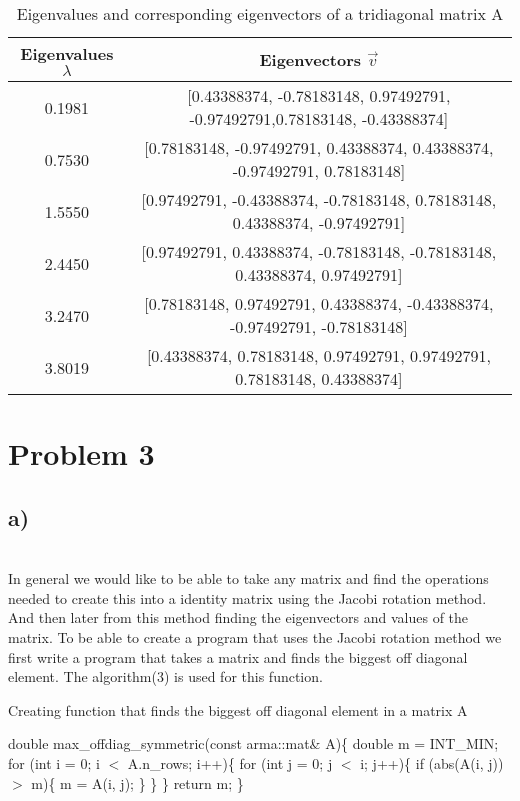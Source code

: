 \documentclass[english,notitlepage]{revtex4-1}  %
\begin{document}
\begin{table}%
    \centering
    \caption{Eigenvalues and corresponding eigenvectors of a tridiagonal matrix A}
    \begin{tabular}{c@{\hspace{1cm}} c}
        \hline
        Eigenvalues $\lambda$ & Eigenvectors $\vec{v}$ \\
        \hline
        0.1981 & [0.43388374, -0.78183148, 0.97492791, -0.97492791,0.78183148, -0.43388374]\\
        0.7530 &  [0.78183148, -0.97492791, 0.43388374, 0.43388374, -0.97492791, 0.78183148]\\
        1.5550 & [0.97492791, -0.43388374, -0.78183148, 0.78183148, 0.43388374, -0.97492791]\\
        2.4450 &  [0.97492791, 0.43388374, -0.78183148, -0.78183148, 0.43388374, 0.97492791]\\
        3.2470 &  [0.78183148, 0.97492791, 0.43388374, -0.43388374, -0.97492791, -0.78183148]\\
        3.8019 & [0.43388374, 0.78183148, 0.97492791, 0.97492791, 0.78183148, 0.43388374]\\
        \hline
    \end{tabular}\label{tab:output_table}
\end{table}

 



\section*{Problem 3}
\subsection*{a)}\
\\
In general we would like to be able to take any matrix and find the operations needed to create this into a identity matrix using the Jacobi rotation method. And then later from this method finding the eigenvectors and values of the matrix. To be able to create a program that uses the Jacobi rotation method we first write a program that takes a matrix and finds the biggest off diagonal element. The algorithm(3) is used for this function.
\begin{algorithm}[H]
    \caption{Creating function that finds the biggest off diagonal element in a matrix A}\label{av_lik_lv}
    \begin{algorithmic}
    	\State double max\_offdiag\_symmetric(const arma::mat\& A)\{
	\State double m = INT\_MIN;
	\State for (int i = 0; i $<$ A.n\_rows; i++)\{
        \State for (int j = 0; j $<$ i; j++)\{
        \State if (abs(A(i, j)) $>$ m)\{
 	\State m = A(i, j);
	\State \}
	\State \}
	\State \}
	\State return m;
	\State \}
    \end{algorithmic}
\end{algorithm}
\end{document}
